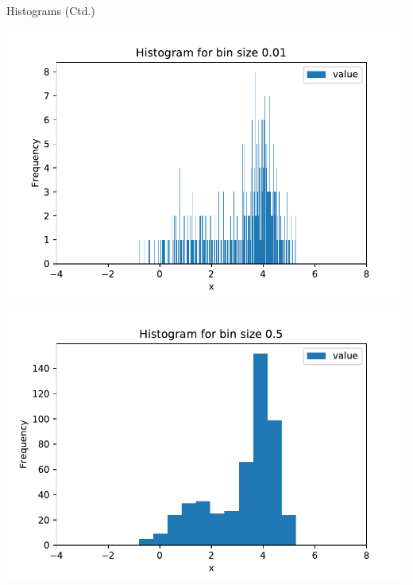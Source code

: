 \begin{frame}{Histograms (Ctd.)}{}
	\begin{minipage}{0.32\framewidth}
		\begin{center}\end{center}
		\includegraphics[scale=0.3]{04_density_estimation/02_img/histo_small}
	\end{minipage}
	\hfill
	\begin{minipage}{0.32\framewidth}
		\begin{center}\end{center}
		\includegraphics[scale=0.3]{04_density_estimation/02_img/histo_medium}
	\end{minipage}
	\hfill
	\begin{minipage}{0.32\framewidth}
		\begin{center}\end{center}

\end{minipage}
\end{frame}
